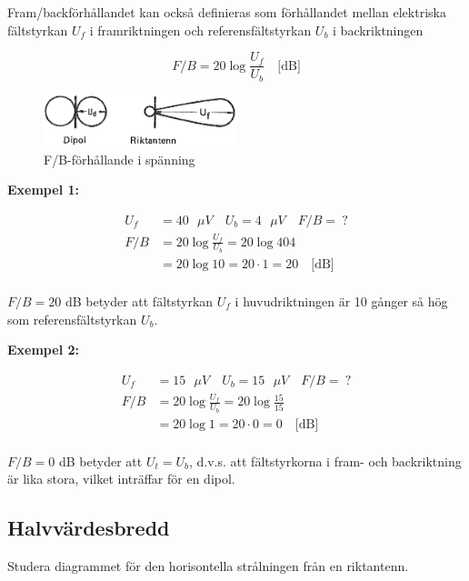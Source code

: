 Fram/backförhållandet kan också definieras som förhållandet mellan elektriska
fältstyrkan \(U_f\) i framriktningen och referensfältstyrkan \(U_b\) i
backriktningen

\[ F/B = 20 \log\frac{U_f}{U_b} \quad \text{[dB]} \]

\begin{figure}
  \includegraphics[width=0.5\textwidth]{images/cropped_pdfs/bild_2_6-09.pdf}
  \caption{F/B-förhållande i spänning}
  \label{fig:bildII6-9}
\end{figure}

\textbf{Exempel 1:}

\begin{align*}
  U_f &= 40 \text{ \(\mu V\)} \quad U_b = 4\text{ \(\mu V\)} \quad F/B =\ ? \\
  F/B &= 20 \log\frac{U_f}{U_b} = 20 \log{40}{4} \\
  &= 20 \log 10 = 20 \cdot 1 = 20 \quad \text{[dB]} \\
\end{align*}

\(F/B = 20\) dB betyder att fältstyrkan \(U_f\) i huvudriktningen är
10 gånger så hög som referensfältstyrkan \(U_b\).

\textbf{Exempel 2:}

\begin{align*}
  U_f &= 15 \text{ \(\mu V\)} \quad U_b = 15\text{ \(\mu V\)} \quad F/B =\ ? \\
  F/B &= 20 \log\frac{U_f}{U_b} = 20 \log\frac{15}{15} \\
  &= 20 \log 1 = 20 \cdot 0 = 0 \quad \text{[dB]} \\
\end{align*}

\(F/B = 0\) dB betyder att \(U_t = U_b\), d.v.s. att fältstyrkorna i
fram- och backriktning är lika stora, vilket inträffar för en dipol.

\subsection{Halvvärdesbredd}

Studera diagrammet för den horisontella strålningen från en riktantenn.

